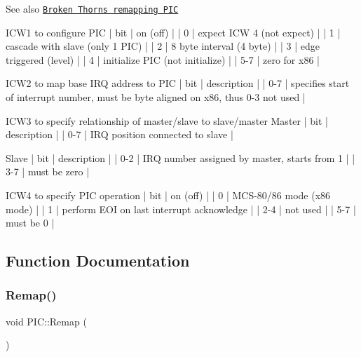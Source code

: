 \begin{DoxySeeAlso}{See also}
\href{http://www.brokenthorn.com/Resources/OSDevPic.html}{\tt Broken Thorn\textquotesingle{}s remapping P\+IC}
\end{DoxySeeAlso}
\begin{DoxyVerb}ICW1 to configure PIC
| bit | on (off)                        |
|   0 | expect ICW 4 (not expect)       |
|   1 | cascade with slave (only 1 PIC) |
|   2 | 8 byte interval (4 byte)        |
|   3 | edge triggered (level)          |
|   4 | initialize PIC (not initialize) |
| 5-7 | zero for x86                    |

ICW2 to map base IRQ address to PIC
| bit | description                                                                         |
| 0-7 | specifies start of interrupt number, must be byte aligned on x86, thus 0-3 not used |

ICW3 to specify relationship of master/slave to slave/master
    Master
    | bit | description                     |
    | 0-7 | IRQ position connected to slave |

    Slave
    | bit | description                                  |
    | 0-2 | IRQ number assigned by master, starts from 1 |
    | 3-7 | must be zero                                 |

ICW4 to specify PIC operation
| bit | on (off)                                  |
|   0 | MCS-80/86 mode (x86 mode)                 |
|   1 | perform EOI on last interrupt acknowledge |
| 2-4 | not used                                  |
| 5-7 | must be 0                                 |
\end{DoxyVerb}
 

\subsection{Function Documentation}
\mbox{\label{namespace_p_i_c_a2a04fe95329faacc43f00ad30fe554b9}} 
\subsubsection{\texorpdfstring{Remap()}{Remap()}}
{\footnotesize\ttfamily void P\+I\+C\+::\+Remap (\begin{DoxyParamCaption}{ }\end{DoxyParamCaption})}



